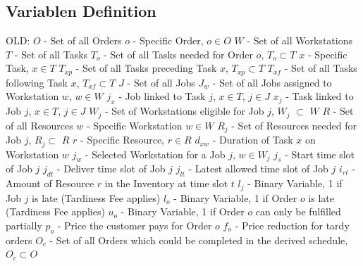 \documentclass[a4paper,12pt,twoside]{scrreprt}
\begin{document}
\subsection*{Variablen Definition}
\begin{flushleft}
OLD: \linebreak
$O$ - Set of all Orders\linebreak
$o$ - Specific Order, $o \in O$\linebreak
$W$	- Set of all Workstations\linebreak
$T$	- Set of all Tasks\linebreak
$T_{o}$ - Set of all Tasks needed for Order $o$, $T_{o} \subset T$\linebreak
$x$ - Specific Task, $x \in T$\linebreak
$T_{xp}$ - Set of all Tasks preceding Task $x$, $T_{xp} \subset T$\linebreak
$T_{xf}$ - Set of all Tasks following Task $x$, $T_{xf} \subset T$\linebreak
$J$ - Set of all Jobs\linebreak
$J_{w}$ - Set of all Jobs assigned to Workstation $w$, $w \in W$\linebreak
$j_{x}$ - Job linked to Task $j$, $x \in T$, $j \in J$\linebreak
$x_{j}$ - Task linked to Job $j$, $x \in T$, $j \in J$\linebreak
$W_{j}$ -	Set of Workstations eligible for Job $j$, $W_{j}$ $\subset$ $W$ \linebreak
$R$ - Set of all Resources \linebreak
$w$ - Specific Workstation $w \in W$ \linebreak
$R_{j}$ - Set of Resources needed for Job $j$, $R_{j} \subset$ $R$ \linebreak
$r$ - Specific Resource, $r \in R$ \linebreak
$d_{xw}$ - Duration of Task $x$ on Workstation $w$ \linebreak
$j_{w}$ - Selected Workstation for a Job $j$, $w\in W_{j}$ \linebreak
$j_{s}$ - Start time slot of Job $j$\linebreak
$j_{dt}$ - Deliver time slot of Job $j$\linebreak
$j_{lt}$ - Latest allowed time slot of Job $j$\linebreak
$i_{rt}$ - Amount of Resource $r$ in the Inventory at time slot $t$\linebreak
$l_{j}$ - Binary Variable, 1 if Job $j$ is late (Tardiness Fee applies)\linebreak
$l_{o}$ - Binary Variable, 1 if Order $o$ is late (Tardiness Fee applies)\linebreak
$u_{o}$ - Binary Variable, 1 if Order $o$ can only be fulfilled partially\linebreak
$p_{o}$ - Price the customer pays for Order $o$ \linebreak
$f_{o}$ - Price reduction for tardy orders \linebreak
$O_{c}$ - Set of all Orders which could be completed in the derived schedule, $O_{c} \subset O$\linebreak


\end{flushleft}
\end{document}
